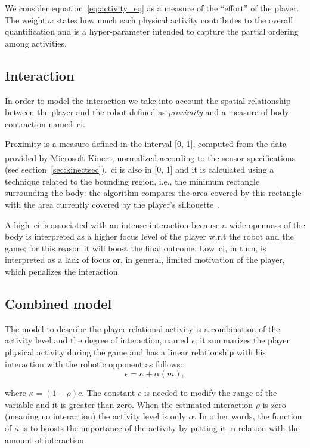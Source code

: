We consider equation~\ref{eq:activity_eq} as a measure of the ``effort'' of the player. The weight $\omega$ states how much each physical activity contributes to the overall quantification and is a hyper-parameter intended to capture the partial ordering among activities.

\subsection{Interaction}\label{Interaction}
In order to model the interaction we take into account the spatial relationship between the player and the robot defined as \textit{proximity} and a measure of body contraction named~\gls{ci}.

Proximity is a measure defined in the interval [0, 1], computed from the data provided by Microsoft Kinect\textsuperscript{\textregistered}, normalized according to the sensor specifications (see section~\ref{sec:kinectsec}).~\gls{ci} is also in [0, 1] and it is calculated using a technique related to the bounding region, i.e., the minimum rectangle surrounding the body: the algorithm compares the area covered by this rectangle with the area currently covered by the player's silhouette~\citep{castellano_recognising_2007}.

A high~\gls{ci} is associated with an intense interaction because a wide openness of the body is interpreted as a higher focus level of the player w.r.t the robot and the game; for this reason it will boost the final outcome. Low~\gls{ci}, in turn, is interpreted as a lack of focus or, in general, limited motivation of the player, which penalizes the interaction.%

\subsection{Combined model}\label{sec:engagement}
The model to describe the player relational activity is a combination of the activity level and the degree of interaction, named $\epsilon$; it summarizes the player physical activity during the game and has a linear relationship with his interaction with the robotic opponent as follows: 
\begin{equation}
\label{enagementeq}
\epsilon=\kappa + \alpha(m),
\end{equation}

where $\kappa= (1-\rho)c$. The constant $c$ is needed to modify the range of the variable and it is greater than zero. When the estimated interaction $\rho$ is zero (meaning no interaction) the activity level is only $\alpha$. %
In other words, the function of $\kappa$ is to boosts the importance of the activity by putting it in relation with the amount of interaction. 

